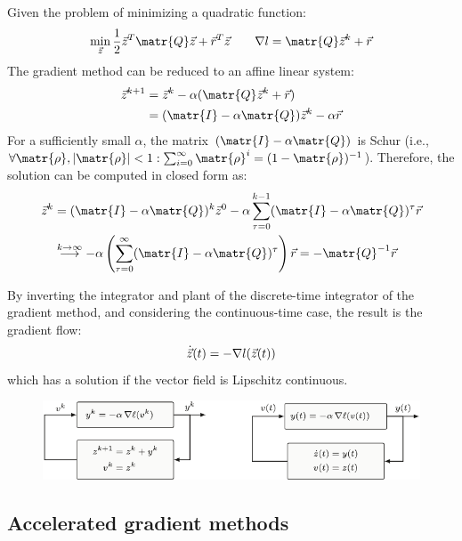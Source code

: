 \begin{remark} 
    Given the problem of minimizing a quadratic function:
    \[
        \min_{\z} \frac{1}{2}\z^T \matr{Q} \z + \vec{r}^T \z
        \qquad
        \nabla l = \matr{Q} \z^k + \vec{r}
    \]
    The gradient method can be reduced to an affine linear system:
    \[
        \begin{split}
            \z^{k+1} &= \z^k - \alpha (\matr{Q} \z^k + \vec{r}) \\
            &= (\matr{I} - \alpha \matr{Q}) \z^k - \alpha \vec{r}
        \end{split}
    \]
    For a sufficiently small $\alpha$, the matrix $(\matr{I} - \alpha \matr{Q})$ is Schur (i.e., $\forall \matr{\rho}, |\matr{\rho}| < 1: \sum_{i=0}^{\infty} \matr{\rho}^i = (1-\matr{\rho})^{-1}$). Therefore, the solution can be computed in closed form as:
    \[
        \begin{split}
            \z^k &= (\matr{I} - \alpha \matr{Q})^k \z^0 - \alpha \sum_{\tau=0}^{k-1} (\matr{I} - \alpha \matr{Q})^\tau \vec{r} \\
            &\overset{k \rightarrow \infty}{\longrightarrow} - \alpha \left( \sum_{\tau=0}^{\infty} (\matr{I} - \alpha \matr{Q})^\tau \right) \vec{r} = -\matr{Q}^{-1} \vec{r}
        \end{split}
    \]
\end{remark}

\begin{remark} 
    By inverting the integrator and plant of the discrete-time integrator of the gradient method, and considering the continuous-time case, the result is the gradient flow:
    \[
        \dot{{\vec{z}}}(t) = -\nabla l({\vec{z}}(t))
    \]
    which has a solution if the vector field is Lipschitz continuous.

    \begin{figure}[H]
        \centering
        \includegraphics[width=0.8\linewidth]{./img/_gradient_flow.pdf}
    \end{figure}
\end{remark}


\subsection{Accelerated gradient methods}

